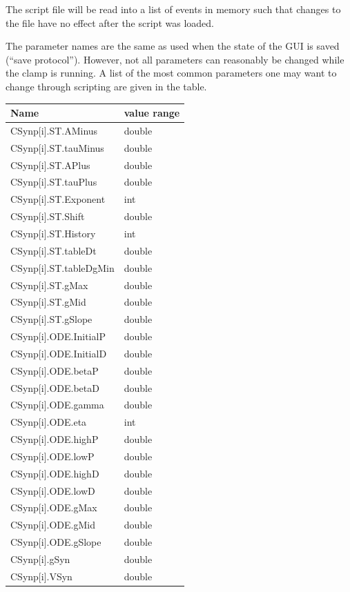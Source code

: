 \documentclass{article}
\begin{document}
The script file will be read into a list of events in memory such that
changes to the file have no effect after the script was loaded.

The parameter names are the same as used when the state of the GUI is
saved (``save protocol''). However, not all parameters can reasonably
be changed while the clamp is running. A list of the most common
parameters one may want to change through scripting are given in the table. \\
\begin{table}
\begin{tabular}[t]{|ll|}
\hline
{\bf Name} & {\bf value range} \\
\hline
CSynp[i].ST.AMinus & double \\
CSynp[i].ST.tauMinus & double \\
CSynp[i].ST.APlus & double \\
CSynp[i].ST.tauPlus & double \\
CSynp[i].ST.Exponent & int \\
CSynp[i].ST.Shift & double \\
CSynp[i].ST.History & int \\
CSynp[i].ST.tableDt & double \\
CSynp[i].ST.tableDgMin & double \\
CSynp[i].ST.gMax & double \\
CSynp[i].ST.gMid & double \\
CSynp[i].ST.gSlope & double \\
CSynp[i].ODE.InitialP & double \\
CSynp[i].ODE.InitialD & double \\
CSynp[i].ODE.betaP & double \\
CSynp[i].ODE.betaD & double \\
CSynp[i].ODE.gamma & double \\ 
CSynp[i].ODE.eta & int \\
CSynp[i].ODE.highP & double \\
CSynp[i].ODE.lowP & double \\
CSynp[i].ODE.highD & double \\
CSynp[i].ODE.lowD & double \\
CSynp[i].ODE.gMax & double \\
CSynp[i].ODE.gMid & double \\
CSynp[i].ODE.gSlope & double \\
CSynp[i].gSyn & double \\
CSynp[i].VSyn & double \\

\end{tabular}
\end{table}
\end{document}

